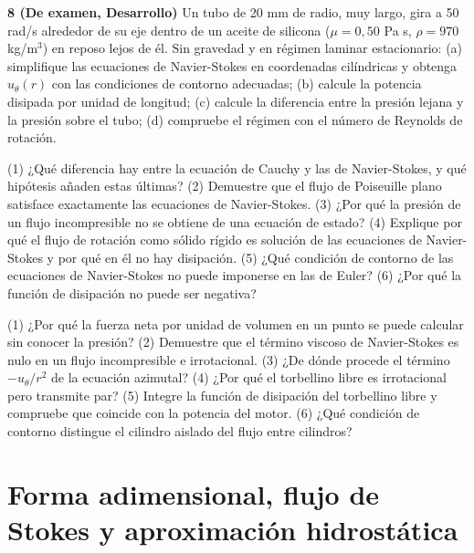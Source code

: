 \documentclass[10pt,openany]{book}
\begin{document}
\begin{tcolorbox}[title={Ejercicios propuestos}, studiumworked, breakable]
\noindent\textbf{8 (De examen, Desarrollo)}
Un tubo de 20 mm de radio, muy largo, gira a 50 rad/s alrededor de su eje dentro de un aceite de silicona (\(\mu = 0{,}50\) Pa s, \(\rho = 970\) kg/m\(^3\)) en reposo lejos de él. Sin gravedad y en régimen laminar estacionario: (a) simplifique las ecuaciones de Navier-Stokes en coordenadas cilíndricas y obtenga \(u_\theta(r)\) con las condiciones de contorno adecuadas; (b) calcule la potencia disipada por unidad de longitud; (c) calcule la diferencia entre la presión lejana y la presión sobre el tubo; (d) compruebe el régimen con el número de Reynolds de rotación.
\end{tcolorbox}

\begin{tcolorbox}[title={Autoevaluación}, studiumcheck, breakable]

(1) ¿Qué diferencia hay entre la ecuación de Cauchy y las de Navier-Stokes, y qué hipótesis añaden estas últimas? (2) Demuestre que el flujo de Poiseuille plano satisface exactamente las ecuaciones de Navier-Stokes. (3) ¿Por qué la presión de un flujo incompresible no se obtiene de una ecuación de estado? (4) Explique por qué el flujo de rotación como sólido rígido es solución de las ecuaciones de Navier-Stokes y por qué en él no hay disipación. (5) ¿Qué condición de contorno de las ecuaciones de Navier-Stokes no puede imponerse en las de Euler? (6) ¿Por qué la función de disipación no puede ser negativa?

(1) ¿Por qué la fuerza neta por unidad de volumen en un punto se puede calcular sin conocer la presión? (2) Demuestre que el término viscoso de Navier-Stokes es nulo en un flujo incompresible e irrotacional. (3) ¿De dónde procede el término \(-u_\theta/r^{2}\) de la ecuación azimutal? (4) ¿Por qué el torbellino libre es irrotacional pero transmite par? (5) Integre la función de disipación del torbellino libre y compruebe que coincide con la potencia del motor. (6) ¿Qué condición de contorno distingue el cilindro aislado del flujo entre cilindros?
\end{tcolorbox}
\studiumchaptercheck

\chapter{Forma adimensional, flujo de Stokes y aproximación hidrostática}
\label{chap:c15}

\end{document}
